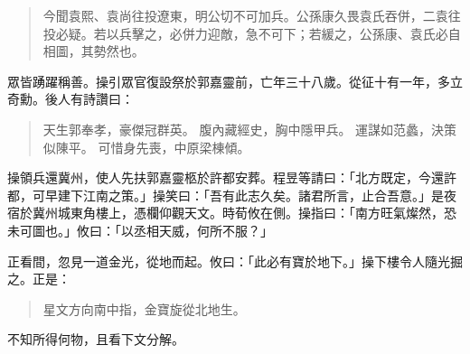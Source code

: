 \begin{quote}
今聞袁熙、袁尚往投遼東，明公切不可加兵。公孫康久畏袁氏吞併，二袁往投必疑。若以兵擊之，必併力迎敵，急不可下；若緩之，公孫康、袁氏必自相圖，其勢然也。
\end{quote}

眾皆踴躍稱善。操引眾官復設祭於郭嘉靈前，亡年三十八歲。從征十有一年，多立奇勳。後人有詩讚曰：

\begin{quote}
天生郭奉孝，豪傑冠群英。
腹內藏經史，胸中隱甲兵。
運謀如范蠡，決策似陳平。
可惜身先喪，中原梁棟傾。
\end{quote}

操領兵還冀州，使人先扶郭嘉靈柩於許都安葬。程昱等請曰：「北方既定，今還許都，可早建下江南之策。」操笑曰：「吾有此志久矣。諸君所言，止合吾意。」是夜宿於冀州城東角樓上，憑欄仰觀天文。時荀攸在側。操指曰：「南方旺氣燦然，恐未可圖也。」攸曰：「以丞相天威，何所不服？」

正看間，忽見一道金光，從地而起。攸曰：「此必有寶於地下。」操下樓令人隨光掘之。正是：

\begin{quote}
星文方向南中指，金寶旋從北地生。
\end{quote}

不知所得何物，且看下文分解。
